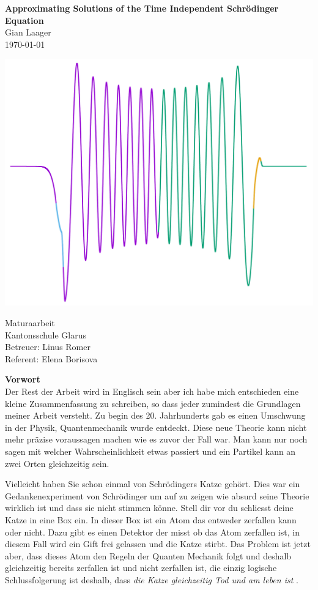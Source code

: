 \documentclass[11pt,DIV=10,final]{scrreprt} %
\begin{document}
\begin{titlepage}
\mbox{}\vspace{0.1\textheight}
\begin{center}
\textbf{\Huge Approximating Solutions of the Time Independent Schrödinger Equation}\\[3ex]
Gian Laager\\
\today
\vspace{0.05\textheight}
\begin{center}
	\includegraphics[width=.7\textwidth]{plots/wave_func_square.pdf}
\end{center}
\vspace{0.05\textheight}
Maturaarbeit\\
Kantonsschule Glarus\\
Betreuer: Linus Romer\\
Referent: Elena Borisova
\end{center}
\end{titlepage}


\tableofcontents

\pagebreak[4]

{\noindent \bfseries \Huge Vorwort}
\\[3ex]
Der Rest der Arbeit wird in Englisch sein aber ich habe mich entschieden eine kleine Zusammenfassung zu schreiben, so dass jeder zumindest die Grundlagen meiner Arbeit versteht.
Zu begin des 20. Jahrhunderts gab es einen Umschwung in der Physik, Quantenmechanik wurde entdeckt. Diese neue Theorie kann nicht mehr präzise voraussagen machen wie es zuvor der Fall war.
Man kann nur noch sagen mit welcher Wahrscheinlichkeit etwas passiert und ein Partikel kann an zwei Orten gleichzeitig sein.

Vielleicht haben Sie schon einmal von Schrödingers Katze gehört. Dies war ein Gedankenexperiment von Schrödinger um auf zu zeigen wie absurd seine Theorie wirklich ist und dass sie nicht stimmen könne.
Stell dir vor du schliesst deine Katze in eine Box ein. In dieser Box ist ein Atom das entweder zerfallen kann oder nicht. Dazu gibt es einen Detektor der misst ob das Atom zerfallen ist, in diesem Fall
wird ein Gift frei gelassen und die Katze stirbt.
Das Problem ist jetzt aber, dass dieses Atom den Regeln der Quanten Mechanik folgt und deshalb gleichzeitig bereits zerfallen ist und nicht zerfallen ist, die einzig logische Schlussfolgerung ist deshalb,
dass \emph{die Katze gleichzeitig Tod und am leben ist} \citep{schrodinger1935gegenwartige}.
\end{document}
